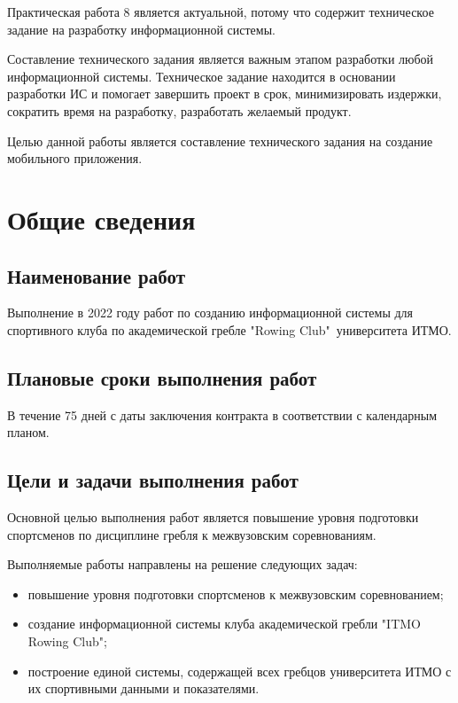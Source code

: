 \documentclass[14pt]{extreport}
\begin{document}
\pagestyle{empty}

\pagestyle{plain}

\tableofcontents

\intro

Практическая работа 8 является актуальной, потому что содержит техническое задание на разработку информационной системы.

Составление технического задания является важным этапом разработки любой информационной системы. Техническое задание находится в основании разработки ИС и помогает завершить проект в срок, минимизировать издержки, сократить время на разработку, разработать желаемый продукт.

Целью данной работы является составление технического задания на создание мобильного приложения.

\chapter{Общие сведения}

\section{Наименование работ}

Выполнение в 2022 году работ по созданию информационной системы для спортивного клуба по академической гребле "Rowing Club"\ университета ИТМО.

\section{Плановые сроки выполнения работ}

В течение 75 дней с даты заключения контракта в соответствии с календарным планом.

\section{Цели и задачи выполнения работ}

Основной целью выполнения работ является повышение уровня подготовки спортсменов по дисциплине гребля к межвузовским соревнованиям.

Выполняемые работы направлены на решение следующих задач:

\begin{itemize}
\item повышение уровня подготовки спортсменов к межвузовским соревнованием;
\item создание информационной системы клуба академической гребли "ITMO Rowing Club";
\item построение единой системы, содержащей всех гребцов университета ИТМО с их спортивными данными и показателями.
\end{itemize}
\end{document}
